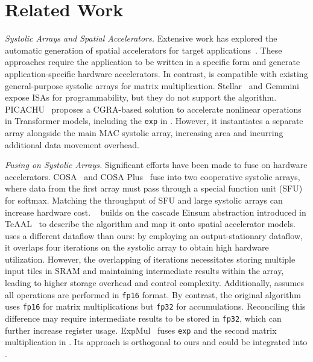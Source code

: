 \section{Related Work}


\emph{Systolic Arrays and Spatial Accelerators.}
Extensive work has explored the automatic generation of spatial accelerators for
target applications~\cite{polysa,autosa,dsagen,soda,interstellar,lego}.
These approaches require the application to be written in a specific form and
generate application-specific hardware accelerators.
In contrast, \MSAGA{} is compatible with existing general-purpose systolic arrays
for matrix multiplication.
Stellar~\cite{stellar} and Gemmini~\cite{ucb-gemmini} expose ISAs for
programmability, but they do not support the \FA{} algorithm.
PICACHU~\cite{picachu} proposes a CGRA-based solution to accelerate nonlinear
operations in Transformer models, including the \texttt{exp} in \FA{}.
However, it instantiates a separate array alongside the main MAC systolic array,
increasing area and incurring additional data movement overhead.


\emph{Fusing \FA{} on Systolic Arrays.}
Significant efforts have been made to fuse \FA{} on hardware accelerators. 
COSA~\cite{COSA} and COSA Plus~\cite{COSAPlus} fuse \FA{} into two 
cooperative systolic arrays, where data from the first array must pass 
through a special function unit (SFU) for softmax. Matching the throughput of SFU 
and large systolic arrays can increase hardware cost.  
\FuseMax{}~\cite{fusemax} builds on the cascade Einsum abstraction 
introduced in TeAAL~\cite{teaal} to describe the \FA{} algorithm 
and map it onto spatial accelerator models. 
\FuseMax{} uses a different dataflow than ours: by employing an output-stationary dataflow,
it overlaps four \FA{} 
iterations on the systolic array to obtain high hardware utilization.
However, the overlapping of iterations necessitates storing multiple input tiles in SRAM and
maintaining intermediate results within the array, leading to higher storage overhead 
and control complexity.
Additionally, \FuseMax{} assumes all \FA{} operations are performed in 
\texttt{fp16} format. By contrast, the original \FA{} algorithm uses 
\texttt{fp16} for matrix multiplications but \texttt{fp32} for accumulations. 
Reconciling this difference may require intermediate results to be stored in 
\texttt{fp32}, which can further increase register usage.
ExpMul~\cite{expmul} fuses \texttt{exp} and the second matrix multiplication in \FA{}.
Its approach is orthogonal to ours and could be integrated into \MSAGA{}.
